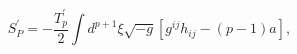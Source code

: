 \begin{equation}
S^{\prime}_{P}=-\frac{T^{\prime}_{p}}{2}\int d^{p+1}{\xi}\sqrt{-g}
\left[g^{ij}h_{ij}-(p-1)a\right],
\label{pol}
\end{equation}

